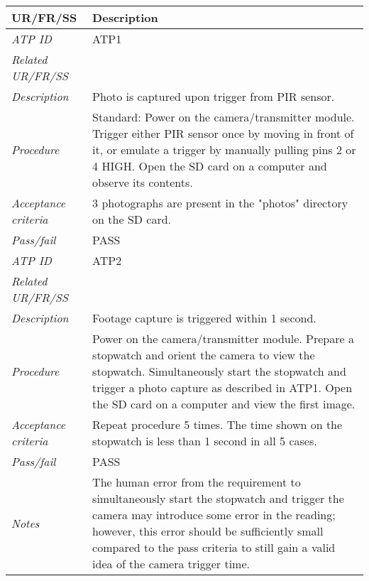 \documentclass[class=report,11pt,crop=false]{standalone}
\begin{document}
\begin{table}[!ht]
    \centering
    \begin{scriptsize}
    \begin{tabularx}{\textwidth}{|p{} X|}
        
        \hline
        \textbf{UR/FR/SS} & \textbf{Description}\\ \hline
        \textit{ATP ID} & ATP1\\
        \textit{Related UR/FR/SS} &\\
        \textit{Description} & Photo is captured upon trigger from PIR sensor.\\
        \textit{Procedure} & Standard: Power on the camera/transmitter module. Trigger either PIR sensor once by moving in front of it, or emulate a trigger by manually pulling pins 2 or 4 HIGH. Open the SD card on a computer and observe its contents.\\
        \textit{Acceptance criteria} & 3 photographs are present in the "photos" directory on the SD card.\\ 
        \textit{Pass/fail} & PASS \\ \hline

        \textit{ATP ID} & ATP2 \\
        \textit{Related UR/FR/SS} & \\
        \textit{Description} & Footage capture is triggered within 1 second.\\
        \textit{Procedure} & Power on the camera/transmitter module. Prepare a stopwatch and orient the camera to view the stopwatch. Simultaneously start the stopwatch and trigger a photo capture as described in ATP1. Open the SD card on a computer and view the first image.\\
        \textit{Acceptance criteria} & Repeat procedure 5 times. The time shown on the stopwatch is less than 1 second in all 5 cases.\\ 
        \textit{Pass/fail} & PASS\\
        \textit{Notes} & The human error from the requirement to simultaneously start the stopwatch and trigger the camera may introduce some error in the reading; however, this error should be sufficiently small compared to the pass criteria to still gain a valid idea of the camera trigger time. \\ \hline


\end{tabularx}
\end{scriptsize}
\end{table}
\end{document}
